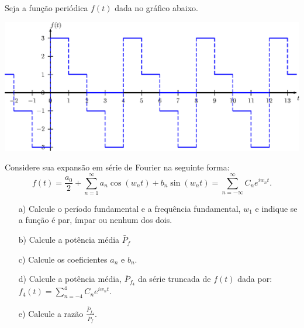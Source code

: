 \begin{exeresol} Seja a função periódica $f(t)$ dada no gráfico abaixo.
    \begin{center}
        \includegraphics[width=\textwidth]{cap_propriedades_series/pics/func_impar_1}
    \end{center}
        
    Considere sua expansão em série de Fourier na seguinte forma: 
$$
f(t)= \frac{a_0}{2}+\sum_{n=1}^\infty a_n\cos(w_n t)+b_n\sin(w_nt)=\sum_{n=-\infty}^\infty C_n e^{iw_n t}.
$$
\begin{itemize}
    \item[a)] Calcule o período fundamental e a frequência fundamental, $w_1$ e indique se a função é par, ímpar ou nenhum dos dois.
  \item[b)]  Calcule a potência média $\bar{P}_f$ 
  \item[c)]  Calcule os coeficientes $a_n$ e $b_n$. 
  \item[d)]  Calcule a potência média, $\bar{P}_{f_4}$ da série truncada de $f(t)$ dada por:
  $f_4(t)=\sum_{n=-4}^4 C_n e^{iw_n t}$.
  \item[e)] Calcule a razão $\frac{\bar{P}_{f_4}}{\bar{P}_f}$.
  \end{itemize}
\end{exeresol}
